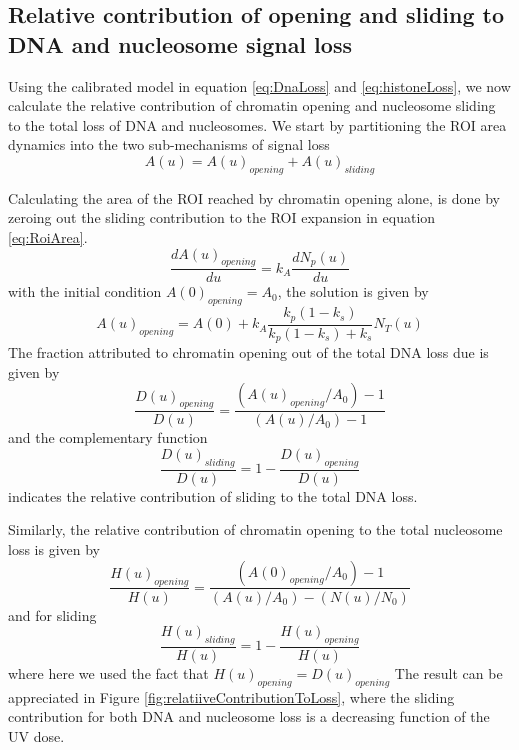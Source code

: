 \documentclass[12pt]{article}
\begin{document}
\subsection{Relative contribution of opening and sliding to DNA and nucleosome signal loss}
Using the calibrated model in equation \ref{eq:DnaLoss} and \ref{eq:histoneLoss}, we now calculate the relative contribution of chromatin opening and nucleosome sliding to the total loss of DNA and nucleosomes.
We start by partitioning the ROI area dynamics into the two sub-mechanisms of signal loss
\begin{equation*}
A(u) = A(u)_{opening}+A(u)_{sliding}
\end{equation*}

Calculating the area of the ROI reached by chromatin opening alone, is done by zeroing out the sliding contribution to the ROI expansion in equation \ref{eq:RoiArea}. 
\begin{equation*}
\frac{dA(u)_{opening}}{du}=k_A\frac{dN_p(u)}{du}
\end{equation*}
with the initial condition $A(0)_{opening}=A_0$, the solution is given by
\begin{equation}
A(u)_{opening}= A(0)+k_A\frac{k_p(1-k_s)}{k_p(1-k_s)+k_s}N_T(u)
\end{equation}
The fraction attributed to chromatin opening out of the total DNA loss due is given by 
\begin{equation}\label{eq:openingContributionDNA}
\frac{D(u)_{opening}}{D(u)}=\frac{\left(A(u)_{opening}/A_0\right)-1}{\left(A(u)/A_0\right) -1}
\end{equation}
and the complementary function 
\begin{equation}\label{eq:slidingContributionDNA}
\frac{D(u)_{sliding}}{D(u)}=1-\frac{D(u)_{opening}}{D(u)}
\end{equation}
indicates the relative contribution of sliding to the total DNA loss. 

Similarly, the relative contribution of chromatin opening to the total nucleosome loss is given by 
\begin{equation}\label{eq:openingContributionHistones}
\frac{H(u)_{opening}}{H(u)} =\frac{\left(A(0)_{opening}/A_0\right)-1}{(A(u)/A_0)-(N(u)/N_0)}
\end{equation}
and for sliding
\begin{equation}\label{eq:slidingContributionHistones}
\frac{H(u)_{sliding}}{H(u)} = 1-\frac{H(u)_{opening}}{H(u)} 
\end{equation}
where here we used the fact that $H(u)_{opening}=D(u)_{opening}$
The result can be appreciated in Figure \ref{fig:relatiiveContributionToLoss}, where the sliding contribution for both DNA and nucleosome loss is a decreasing function of the UV dose. 
\end{document}
